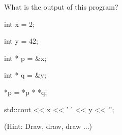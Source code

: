 What is the output of this program?

\begin{consolethree}[escapeinside=||]

int x = 2;

int y = 42;

int * p = &x;

int * q = &y;

*p = *p * *q;

std::cout << x << ' ' << y << '\n';

\end{consolethree}

(Hint: Draw, draw, draw ...)

